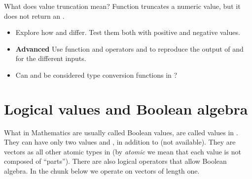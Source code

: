 \documentclass[krantz2]{krantz}\usepackage{knitr}
\begin{document}
\begin{playground}
What does value truncation mean? Function  truncates a numeric value, but it does not return an .
\begin{itemize}
  \item Explore how  and  differ. Test them both with positive and negative values.
  \item \textbf{Advanced} Use function  and operators \Roperator{+} and \Roperator{-} to reproduce the output of  and  for the different inputs.
  \item Can  and  be considered type conversion functions in \Rlang?
\end{itemize}
\end{playground}


\section{Logical values and Boolean algebra}\label{sec:calc:boolean}
What in Mathematics are usually called Boolean values, are called  values in \Rlang. They can have only two values  and , in addition to  (not available). They are vectors as all other atomic types in \Rlang (by \emph{atomic} we mean that each value is not composed of ``parts''). There are also logical operators that allow Boolean algebra. In the chunk below we operate on  vectors of length one.
\end{document}
